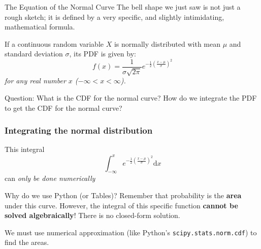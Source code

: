 \begin{frame}{The Equation of the Normal Curve}
    The bell shape we just saw is not just a rough sketch; it is defined by a very specific, and slightly intimidating, mathematical formula.

    \begin{definition}
        If a continuous random variable $X$ is normally distributed with mean $\mu$ and standard deviation $\sigma$, its PDF is given by:
        \[ f(x) = \frac{1}{\sigma \sqrt{2\pi}} e^{-\frac{1}{2}\left(\frac{x-\mu}{\sigma}\right)^2} \]
        \textit{for any real number $x$ ($-\infty < x < \infty$).}
    \end{definition}
    
    \begin{example}{Question: What is the CDF for the normal curve?}
        How do we integrate the PDF to get the CDF for the normal curve?
    \end{example}


\end{frame}

\begin{frame}
\frametitle{Integrating the normal distribution}
\begin{solution}
This integral 
\[
\int_{-\infty}^{x} e^{-\frac{1}{2}\left(\frac{x-\mu}{\sigma}\right)^2} \mathrm{d}x
\]
can \emph{only be done numerically}
\end{solution}

\pause

\begin{block}{Why do we use Python (or Tables)?}
        Remember that probability is the \textbf{area} under this curve. However, the integral of this specific function \textbf{cannot be solved algebraically}! There is no closed-form solution. 
        
        We must use numerical approximation (like Python's \texttt{scipy.stats.norm.cdf}) to find the areas.
    \end{block}

\end{frame}

